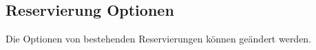 \documentclass[../SubfileFeatures.tex]{subfiles}
\begin{document}
    \subsection{Reservierung Optionen}
	Die Optionen von bestehenden Reservierungen können geändert werden.
\end{document}
